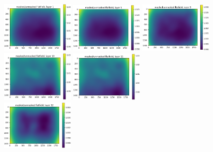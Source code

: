\documentclass[letterpaper,11pt]{article}
\begin{document}
\begin{figure}[!ht]
\centering
\includegraphics[width=0.32\textwidth]{images/results/masked_over_unmasked_flatfield_image_layers_polaris/masked_over_unmasked_flatfield_layer_1}
\includegraphics[width=0.32\textwidth]{images/results/masked_over_unmasked_flatfield_image_layers_polaris/masked_over_unmasked_flatfield_layer_5}
\includegraphics[width=0.32\textwidth]{images/results/masked_over_unmasked_flatfield_image_layers_polaris/masked_over_unmasked_flatfield_layer_9}
\includegraphics[width=0.32\textwidth]{images/results/masked_over_unmasked_flatfield_image_layers_polaris/masked_over_unmasked_flatfield_layer_10}
\includegraphics[width=0.32\textwidth]{images/results/masked_over_unmasked_flatfield_image_layers_polaris/masked_over_unmasked_flatfield_layer_11} \\
\includegraphics[width=0.32\textwidth]{images/results/masked_over_unmasked_flatfield_image_layers_polaris/masked_over_unmasked_flatfield_layer_12}

\end{figure}
\end{document}
